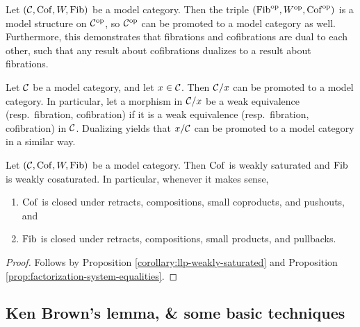\begin{construction}[Opposites]
	Let \((\mathcal{C}, \operatorname{Cof}, W, \operatorname{Fib})\) be a model category. Then the triple \((\operatorname{Fib}^{\mathrm{op}}, W^{\mathrm{op}}, \operatorname{Cof}^{\mathrm{op}})\) is a model structure on \(\mathcal{C}^{\mathrm{op}}\), so \(\mathcal{C}^{\mathrm{op}}\) can be promoted to a model category
	as well. Furthermore, this demonstrates that fibrations and cofibrations are dual to each other, such that any result about cofibrations dualizes to a result about fibrations.
\end{construction}
\begin{construction}[Slices]
	Let \(\mathcal{C}\) be a model category, and let \(x\in\mathcal{C}\). Then \(\mathcal{C}/x\) can be promoted to a model category. In particular, let a morphism in \(\mathcal{C}/x\) be a weak equivalence (resp.\ fibration, cofibration)
	if it is a weak equivalence (resp.\ fibration, cofibration) in \(\mathcal{C}\). Dualizing yields that \(x/\mathcal{C}\) can be promoted to a model category in a similar way.
\end{construction}

\begin{proposition}\label{prop:model-category-cof-saturated-fib-cosaturated}
	Let \((\mathcal{C},\operatorname{Cof},W,\operatorname{Fib})\) be a model category. Then \(\operatorname{Cof}\) is weakly saturated and \(\operatorname{Fib}\) is weakly cosaturated. In particular, whenever it makes sense,
	\begin{enumerate}[label=(\arabic*)]
		\item \(\operatorname{Cof}\) is closed under retracts, compositions, small coproducts, and pushouts, and
		\item \(\operatorname{Fib}\) is closed under retracts, compositions, small products, and pullbacks.
	\end{enumerate}
\end{proposition}
\begin{proof}
Follows by Proposition \ref{corollary:llp-weakly-saturated} and Proposition \ref{prop:factorization-system-equalities}.
\end{proof}

\subsection{Ken Brown's lemma, \& some basic techniques}

